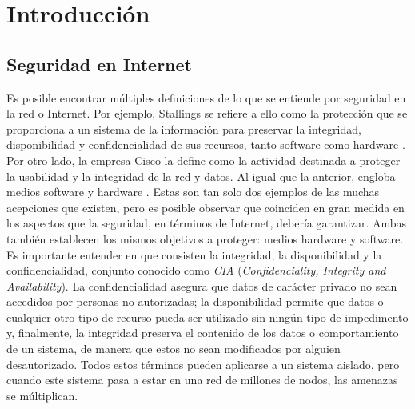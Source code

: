 
\chapter{Introducción} %

\label{Chapter1} %


\section{Seguridad en Internet}

Es posible encontrar múltiples definiciones de lo que se entiende por seguridad en la red o Internet. Por ejemplo, Stallings se refiere a ello como la protección que se proporciona a un sistema de la información para preservar la integridad, disponibilidad y confidencialidad de sus recursos, tanto software como hardware \cite{Stallings2016}. Por otro lado, la empresa Cisco la define como la actividad destinada a proteger la usabilidad y la integridad de la red y datos. Al igual que la anterior, engloba medios software y hardware \cite{cisco}. Estas son tan solo dos ejemplos de las muchas acepciones que existen, pero es posible observar que coinciden en gran medida en los aspectos que la seguridad, en términos de Internet, debería garantizar. Ambas también establecen los mismos objetivos a proteger: medios hardware y software. Es importante entender en que consisten la integridad, la disponibilidad y la confidencialidad, conjunto conocido como \textit{CIA} (\textit{Confidenciality, Integrity and Availability}). La confidencialidad asegura que datos de carácter privado no sean accedidos por personas no autorizadas; la disponibilidad permite que datos o cualquier otro tipo de recurso pueda ser utilizado sin ningún tipo de impedimento y, finalmente, la integridad preserva el contenido de los datos o comportamiento de un sistema, de manera que estos no sean modificados por alguien desautorizado. Todos estos términos pueden aplicarse a un sistema aislado, pero cuando este sistema pasa a estar en una red de millones de nodos, las amenazas se múltiplican.  

